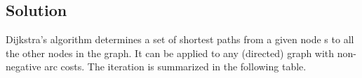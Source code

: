 \documentclass[12pt, a4paper]{report}
\begin{document}
    \subsection*{Solution}
        Dijkstra's algorithm determines a set of shortest paths from a given node s to all the other nodes in the graph. It can be applied to any (directed) graph with 
        non-negative arc costs. The iteration is summarized in the following table. 
        \begin{table}[H]
            \centering
\end{table}
\end{document}
